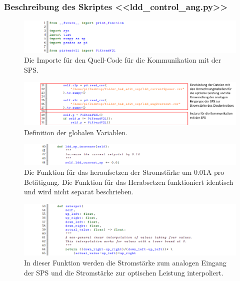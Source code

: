 \begin{appendix}
\begin{landscape}
\subsubsection{Beschreibung des Skriptes <<ldd\_control\_ang.py>>}

\begin{figure}[H]
    \centering
    \includegraphics[scale=0.8]{98_images/src/fhnw_pro6m_quellcode_26.png}
    \caption*{Die Importe für den Quell-Code für die Kommunikation mit der SPS.}
    \label{fig:fhnw_pro6m_quellcode_26}
\end{figure} 

\begin{figure}[H]
    \centering
    \includegraphics[scale=0.8]{98_images/src/fhnw_pro6m_quellcode_27.png}
    \caption*{Definition der globalen Variablen.}
    \label{fig:fhnw_pro6m_quellcode_27}
\end{figure} 

\begin{figure}[H]
    \centering
    \includegraphics[scale=0.8]{98_images/src/fhnw_pro6m_quellcode_28.png}
    \caption*{Die Funktion für das heraufsetzen der Stromstärke um 0.01A pro Betätigung. Die Funktion für das Herabsetzen funktioniert identisch und wird nicht separat beschrieben.}
    \label{fig:fhnw_pro6m_quellcode_28}
\end{figure} 

\begin{figure}[H]
    \centering
    \includegraphics[scale=0.8]{98_images/src/fhnw_pro6m_quellcode_29.png}
    \caption*{In dieser Funktion werden die Stromstärke zum analogen Eingang der SPS und die Stromstärke zur optischen Leistung interpoliert.}
    \label{fig:fhnw_pro6m_quellcode_29}
\end{figure} 


\end{landscape}
\end{appendix}
